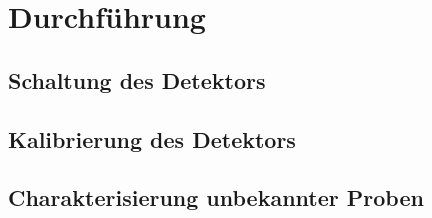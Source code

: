 \newpage
\section{Durchführung}
\label{sec:Durchführung}

\subsection{Schaltung des Detektors}
\label{sec:Schaltungen}

\subsection{Kalibrierung des Detektors}
\label{sec:KalibrierungBeschreibung}

\subsection{Charakterisierung unbekannter Proben}
\label{sec:CharakterisierungBeschreibung}

